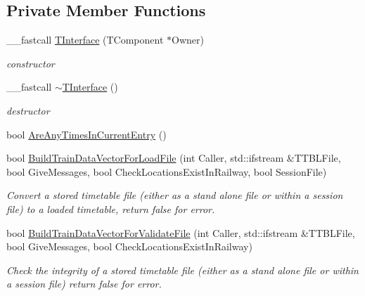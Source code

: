 \subsection*{Private Member Functions}
\begin{DoxyCompactItemize}
\item 
\mbox{\label{class_t_interface_a0659e748042e378f3e325652c9c2e6d2}} 
\+\_\+\+\_\+fastcall \mbox{\hyperlink{class_t_interface_a0659e748042e378f3e325652c9c2e6d2}{T\+Interface}} (T\+Component $\ast$Owner)
\begin{DoxyCompactList}\small\item\em constructor \end{DoxyCompactList}\item 
\mbox{\label{class_t_interface_aba108dfa899ffdc641432d672e455873}} 
\+\_\+\+\_\+fastcall \mbox{\hyperlink{class_t_interface_aba108dfa899ffdc641432d672e455873}{$\sim$\+T\+Interface}} ()
\begin{DoxyCompactList}\small\item\em destructor \end{DoxyCompactList}\item 
bool \mbox{\hyperlink{class_t_interface_acb0a5b4f8362e75bb7b34d981e4783d9}{Are\+Any\+Times\+In\+Current\+Entry}} ()
\item 
\mbox{\label{class_t_interface_a148e3f99d39f596dbd7d490403936154}} 
bool \mbox{\hyperlink{class_t_interface_a148e3f99d39f596dbd7d490403936154}{Build\+Train\+Data\+Vector\+For\+Load\+File}} (int Caller, std\+::ifstream \&T\+T\+B\+L\+File, bool Give\+Messages, bool Check\+Locations\+Exist\+In\+Railway, bool Session\+File)
\begin{DoxyCompactList}\small\item\em Convert a stored timetable file (either as a stand alone file or within a session file) to a loaded timetable, return false for error. \end{DoxyCompactList}\item 
\mbox{\label{class_t_interface_a4ffe7e6eb2421577f670a52f556aef97}} 
bool \mbox{\hyperlink{class_t_interface_a4ffe7e6eb2421577f670a52f556aef97}{Build\+Train\+Data\+Vector\+For\+Validate\+File}} (int Caller, std\+::ifstream \&T\+T\+B\+L\+File, bool Give\+Messages, bool Check\+Locations\+Exist\+In\+Railway)
\begin{DoxyCompactList}\small\item\em Check the integrity of a stored timetable file (either as a stand alone file or within a session file) return false for error. \end{DoxyCompactList}\item 

\end{DoxyCompactItemize}

